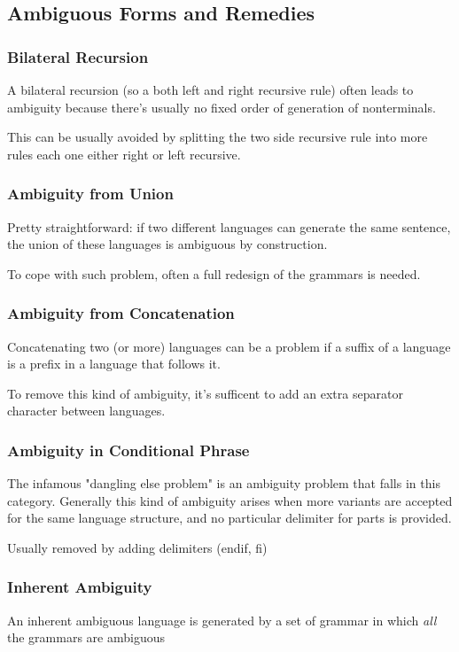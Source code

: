 		\subsection{Ambiguous Forms and Remedies}
			\subsubsection{Bilateral Recursion}
				A bilateral recursion (so a both left and right recursive rule) often leads to ambiguity because there's usually no fixed order of generation 
				of nonterminals.

				This can be usually avoided by splitting the two side recursive rule into more rules each one either right or left recursive.

			\subsubsection{Ambiguity from Union}
				Pretty straightforward: if two different languages can generate the same sentence, the union of these languages is ambiguous by construction.

				To cope with such problem, often a full redesign of the grammars is needed.
			\subsubsection{Ambiguity from Concatenation}
				Concatenating two (or more) languages can be a problem if a suffix of a language is a prefix in a language that follows it.

				To remove this kind of ambiguity, it's sufficent to add an extra separator character between languages.
			\subsubsection{Ambiguity in Conditional Phrase}
				The infamous "dangling else problem" is an ambiguity problem that falls in this category. Generally this kind of ambiguity arises when more 
				variants are accepted for the same language structure, and no particular delimiter for parts is provided.

				Usually removed by adding delimiters (endif, fi)
			\subsubsection{Inherent Ambiguity}
				An inherent ambiguous language is generated by a set of grammar in which \emph{all} the grammars are ambiguous
	
